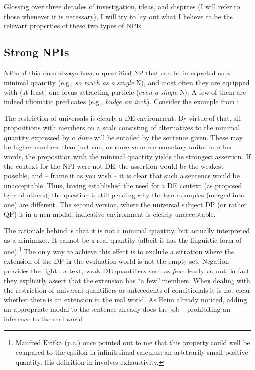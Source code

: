 \documentclass[output=paper,colorlinks,citecolor=brown,
]{langscibook}
\begin{document}
Glossing over three decades of investigation, ideas, and disputes (I will refer to those whenever it is necessary), I
will try to lay out what I believe to be the relevant properties of these two types of NPIs.

\subsection{Strong NPIs}

NPIs of this class always have a quantified NP that can be interpreted as a minimal quantity (e.g.,
\textit{so much as a single} N), and most often they are equipped with (at least) one
focus-attracting particle (\textit{even a single} N). A few of them are indeed idiomatic predicates
(e.g., \textit{budge an inch}). Consider the example from \citet[104]{heim1984}:


The restriction of universals is clearly a DE environment. By virtue of that, all propositions with members on a scale
consisting of alternatives to the minimal quantity expressed by \textit{a dime} will be entailed by the sentence given.
These may be higher numbers than just one, or more valuable monetary units. In other words, the proposition with the
minimal quantity yields the strongest assertion. If the context for the NPI were not DE, the assertion would be the
weakest possible, and -- frame it as you wish -- it is clear that such a sentence would be unacceptable. Thus, having
established the need for a DE context (as proposed by \citet{ladusaw1979} and others), the question is still
pending why the two examples (merged into one) are different. The second version, where the universal subject DP (or rather QP) is in
a non-modal, indicative environment is clearly unacceptable.

The rationale behind is that it is not a minimal quantity, but actually interpreted as a minimizer. It cannot be a real
quantity (albeit it has the linguistic form of one).\footnote{Manfred Krifka (p.c.) once pointed out to me that this
property could well be compared to the epsilon in infinitesimal calculus: an arbitrarily small positive quantity. His
definition in \cite{krifka1995} involves exhaustivity.} The only way to achieve this effect is to exclude a situation
where the extension of the DP in the evaluation world is not the empty set. Negation provides the right context, weak
DE quantifiers such as \textit{few} clearly do not, in fact they explicitly assert that the extension has ``a few''
members. When dealing with the restriction of universal quantifiers or antecedents of conditionals it is not clear
whether there is an extension in the real world. As Heim already noticed, adding an appropriate modal to the sentence
already does the job -- prohibiting an inference to the real world.
\end{document}
